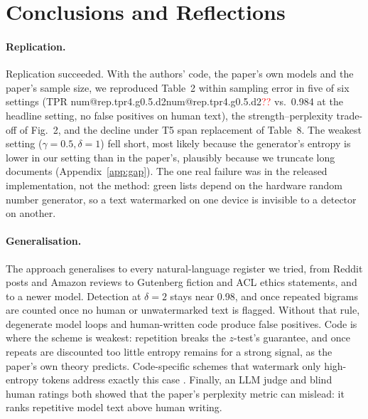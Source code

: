 \documentclass[11pt]{article}
\makeatletter
\newcommand{\V}[1]{\ifcsname num@#1\endcsname\csname num@#1\endcsname\else\textcolor{red}{??\detokenize{#1}}\fi}
\makeatother
\begin{document}
\section{Conclusions and Reflections}
\label{sec:conc}
\paragraph{Replication.} Replication succeeded. With the authors' code, the paper's own models and the paper's sample size, we reproduced Table~2 within sampling error in five of six settings (TPR \V{rep.tpr4.g0.5.d2} vs.\ 0.984 at the headline setting, no false positives on human text), the strength--perplexity trade-off of Fig.~2, and the decline under T5 span replacement of Table~8. The weakest setting ($\gamma{=}0.5,\delta{=}1$) fell short, most likely because the generator's entropy is lower in our setting than in the paper's, plausibly because we truncate long documents (Appendix~\ref{app:gap}). The one real failure was in the released implementation, not the method: green lists depend on the hardware random number generator, so a text watermarked on one device is invisible to a detector on another.

\paragraph{Generalisation.} The approach generalises to every natural-language register we tried, from Reddit posts and Amazon reviews to Gutenberg fiction and ACL ethics statements, and to a newer model. Detection at $\delta{=}2$ stays near 0.98, and once repeated bigrams are counted once no human or unwatermarked text is flagged. Without that rule, degenerate model loops and human-written code produce false positives. Code is where the scheme is weakest: repetition breaks the $z$-test's guarantee, and once repeats are discounted too little entropy remains for a strong signal, as the paper's own theory predicts. Code-specific schemes that watermark only high-entropy tokens address exactly this case \citep{lee2024code}. Finally, an LLM judge and blind human ratings both showed that the paper's perplexity metric can mislead: it ranks repetitive model text above human writing.
\end{document}
